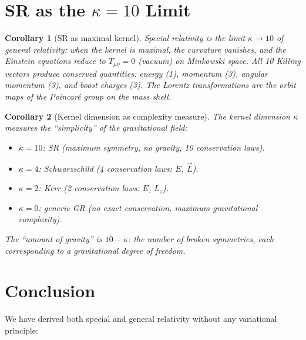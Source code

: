 \documentclass[11pt,twocolumn]{article}
\theoremstyle{plain}\newtheorem{theorem}{Theorem}\newtheorem{proposition}[theorem]{Proposition}\newtheorem{corollary}[theorem]{Corollary}\newtheorem{lemma}[theorem]{Lemma}
\theoremstyle{definition}\newtheorem{definition}[theorem]{Definition}
\theoremstyle{remark}\newtheorem{remark}[theorem]{Remark}
\begin{document}
\section{SR as the $\kappa = 10$ Limit}
\label{sec:SR-limit}

\begin{corollary}[SR as maximal kernel]\label{cor:sr-limit}
Special relativity is the limit $\kappa \to 10$ of general relativity: when the kernel is maximal, the curvature vanishes, and the Einstein equations reduce to $T_{\mu\nu} = 0$ (vacuum) on Minkowski space. All 10 Killing vectors produce conserved quantities: energy (1), momentum (3), angular momentum (3), and boost charges (3). The Lorentz transformations are the orbit maps of the Poincar\'e group on the mass shell.
\end{corollary}

\begin{corollary}[Kernel dimension as complexity measure]\label{cor:complexity}
The kernel dimension $\kappa$ measures the ``simplicity'' of the gravitational field:
\begin{itemize}
    \item $\kappa = 10$: SR (maximum symmetry, no gravity, 10 conservation laws).
    \item $\kappa = 4$: Schwarzschild (4 conservation laws: $E$, $\vec{L}$).
    \item $\kappa = 2$: Kerr (2 conservation laws: $E$, $L_z$).
    \item $\kappa = 0$: generic GR (no exact conservation, maximum gravitational complexity).
\end{itemize}
The ``amount of gravity'' is $10 - \kappa$: the number of broken symmetries, each corresponding to a gravitational degree of freedom.
\end{corollary}


\section{Conclusion}
\label{sec:conclusion}

We have derived both special and general relativity without any variational principle:
\end{document}
